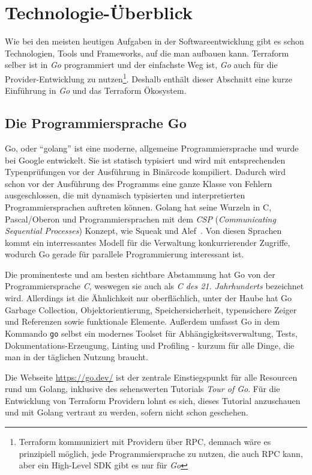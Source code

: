 \documentclass[paper=a4,11pt,numbers=noenddot]{article}
\begin{document}
\section{Technologie-Überblick}
\label{sec:technology-overview}

Wie bei den meisten heutigen Aufgaben in der Softwareentwicklung gibt es schon Technologien, Tools und Frameworks, auf die man aufbauen kann. Terraform selber ist in \emph{Go} programmiert und der einfachste Weg ist, \emph{Go} auch für die Provider-Entwicklung zu nutzen\footnote{Terraform kommuniziert mit Providern über RPC, demnach wäre es prinzipiell möglich, jede Programmiersprache zu nutzen, die auch RPC kann, aber ein High-Level SDK gibt es nur für \emph{Go}}. Deshalb enthält dieser Abschnitt eine kurze Einführung in \emph{Go} und das Terraform Ökosystem.

\subsection{Die Programmiersprache Go}
\label{subsec:go-progr-lang}

Go, oder ``golang'' ist eine moderne, allgemeine Programmiersprache und wurde bei Google entwickelt. Sie ist statisch typisiert und wird mit entsprechenden Typenprüfungen vor der Ausführung in Binärcode kompiliert. Dadurch wird schon vor der Ausführung des Programms eine ganze Klasse von Fehlern ausgeschlossen, die mit dynamisch typisierten und interpretierten Programmiersprachen auftreten können. Golang hat seine Wurzeln in C, Pascal/Oberon und Programmiersprachen mit dem \emph{CSP} (\emph{Communicating Sequential Processes}) Konzept, wie Squeak und Alef~\autocite{donovan_go_2016}. Von diesen Sprachen kommt ein interressantes Modell für die Verwaltung konkurrierender Zugriffe, wodurch Go gerade für parallele Programmierung interessant ist.

Die prominenteste und am besten sichtbare Abstammung hat Go von der Programmiersprache \emph{C}, weswegen sie auch als \emph{C des 21. Jahrhunderts} bezeichnet wird. Allerdings ist die Ähnlichkeit nur oberflächlich, unter der Haube hat Go Garbage Collection, Objektorientierung, Speichersicherheit, typensichere Zeiger und Referenzen sowie funktionale Elemente. Außerdem umfasst Go in dem Kommando \verb'go' selbst ein modernes Toolset für Abhängigkeitsverwaltung, Tests, Dokumentations-Erzeugung, Linting und Profiling - kurzum für alle Dinge, die man in der täglichen Nutzung braucht.

Die Webseite \url{https://go.dev/} ist der zentrale Einstiegspunkt für alle Resourcen rund um Golang, inklusive des sehenswerten Tutorials \emph{Tour of Go}. Für die Entwicklung von Terraform Providern lohnt es sich, dieses Tutorial anzuschauen und mit Golang vertraut zu werden, sofern nicht schon geschehen.
\end{document}

